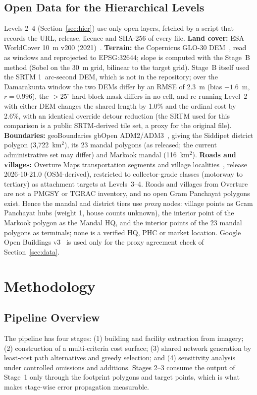 \documentclass[journal]{IEEEtran}
\begin{document}
\subsection{Open Data for the Hierarchical Levels}\label{sec:opendata}
Levels 2--4 (Section~\ref{sec:hier}) use only open layers, fetched by a script that records the URL, release, licence and SHA-256 of every file. \textbf{Land cover:} ESA WorldCover 10~m v200 (2021)~\cite{zanaga2021worldcover}. \textbf{Terrain:} the Copernicus GLO-30 DEM~\cite{esa2022copdem}, read as windows and reprojected to EPSG:32644; slope is computed with the Stage~B method (Sobel on the 30~m grid, bilinear to the target grid). Stage~B itself used the SRTM 1~arc-second DEM, which is not in the repository; over the Damarakunta window the two DEMs differ by an RMSE of 2.3~m (bias $-1.6$~m, $r=0.996$), the $>25^\circ$ hard-block mask differs in no cell, and re-running Level~2 with either DEM changes the shared length by 1.0\% and the ordinal cost by 2.6\%, with an identical override detour reduction (the SRTM used for this comparison is a public SRTM-derived tile set, a proxy for the original file). \textbf{Boundaries:} geoBoundaries gbOpen ADM2/ADM3~\cite{runfola2020geoboundaries}, giving the Siddipet district polygon (3{,}722~km$^2$), its 23 mandal polygons (as released; the current administrative set may differ) and Markook mandal (116~km$^2$). \textbf{Roads and villages:} Overture Maps transportation segments and village localities~\cite{overture2026}, release 2026-10-21.0 (OSM-derived), restricted to collector-grade classes (motorway to tertiary) as attachment targets at Levels~3--4. Roads and villages from Overture are not a PMGSY or TGRAC inventory, and no open Gram Panchayat polygons exist. Hence the mandal and district tiers use \emph{proxy} nodes: village points as Gram Panchayat hubs (weight 1, house counts unknown), the interior point of the Markook polygon as the Mandal HQ, and the interior points of the 23 mandal polygons as terminals; none is a verified HQ, PHC or market location. Google Open Buildings v3~\cite{sirko2021openbuildings} is used only for the proxy agreement check of Section~\ref{sec:data}.

\section{Methodology}\label{sec:method}

\subsection{Pipeline Overview}
The pipeline has four stages: (1) building and facility extraction from imagery; (2) construction of a multi-criteria cost surface; (3) shared network generation by least-cost path alternatives and greedy selection; and (4) sensitivity analysis under controlled omissions and additions. Stages 2--3 consume the output of Stage~1 only through the footprint polygons and target points, which is what makes stage-wise error propagation measurable.
\end{document}
